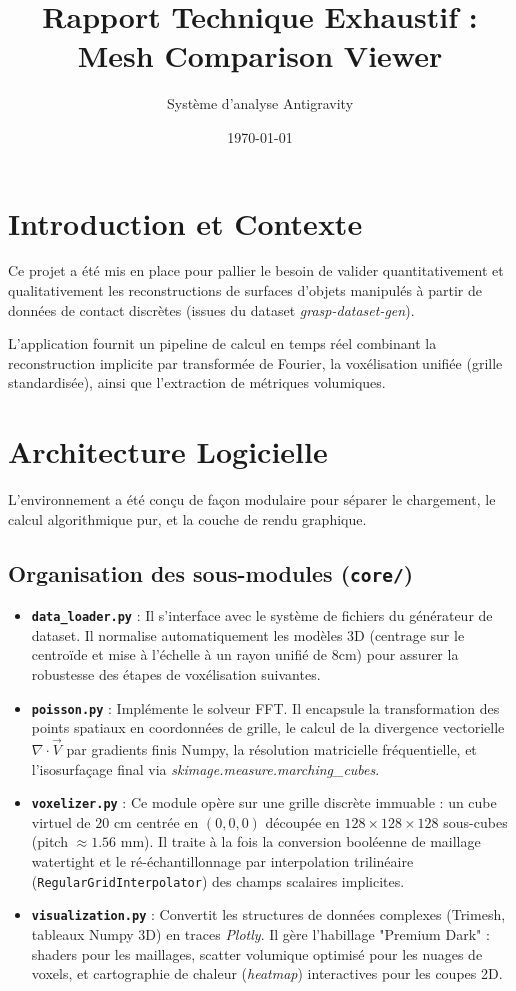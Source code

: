 \documentclass[11pt, a4paper]{article}
\title{Rapport Technique Exhaustif : Mesh Comparison Viewer}
\author{Système d'analyse Antigravity}
\date{\today}
\begin{document}
\maketitle

\tableofcontents
\newpage

\section{Introduction et Contexte}
Ce projet a été mis en place pour pallier le besoin de valider quantitativement et qualitativement les reconstructions de surfaces d'objets manipulés à partir de données de contact discrètes (issues du dataset \textit{grasp-dataset-gen}). 

L'application fournit un pipeline de calcul en temps réel combinant la reconstruction implicite par transformée de Fourier, la voxélisation unifiée (grille standardisée), ainsi que l'extraction de métriques volumiques.

\section{Architecture Logicielle}
L'environnement a été conçu de façon modulaire pour séparer le chargement, le calcul algorithmique pur, et la couche de rendu graphique.

\subsection{Organisation des sous-modules (\texttt{core/})}
\begin{itemize}
    \item \textbf{\texttt{data\_loader.py}} :
        Il s'interface avec le système de fichiers du générateur de dataset. Il normalise automatiquement les modèles 3D (centrage sur le centroïde et mise à l'échelle à un rayon unifié de 8cm) pour assurer la robustesse des étapes de voxélisation suivantes.
    \item \textbf{\texttt{poisson.py}} :
        Implémente le solveur FFT. Il encapsule la transformation des points spatiaux en coordonnées de grille, le calcul de la divergence vectorielle $\nabla \cdot \vec{V}$ par gradients finis Numpy, la résolution matricielle fréquentielle, et l'isosurfaçage final via \textit{skimage.measure.marching\_cubes}.
    \item \textbf{\texttt{voxelizer.py}} :
        Ce module opère sur une grille discrète immuable : un cube virtuel de $20$ cm centrée en $(0,0,0)$ découpée en $128 \times 128 \times 128$ sous-cubes (pitch $\approx 1.56$ mm). Il traite à la fois la conversion booléenne de maillage watertight et le ré-échantillonnage par interpolation trilinéaire (\texttt{RegularGridInterpolator}) des champs scalaires implicites.
    \item \textbf{\texttt{visualization.py}} :
        Convertit les structures de données complexes (Trimesh, tableaux Numpy 3D) en traces \textit{Plotly}. Il gère l'habillage "Premium Dark" : shaders pour les maillages, scatter volumique optimisé pour les nuages de voxels, et cartographie de chaleur (\textit{heatmap}) interactives pour les coupes 2D.
\end{itemize}
\end{document}
